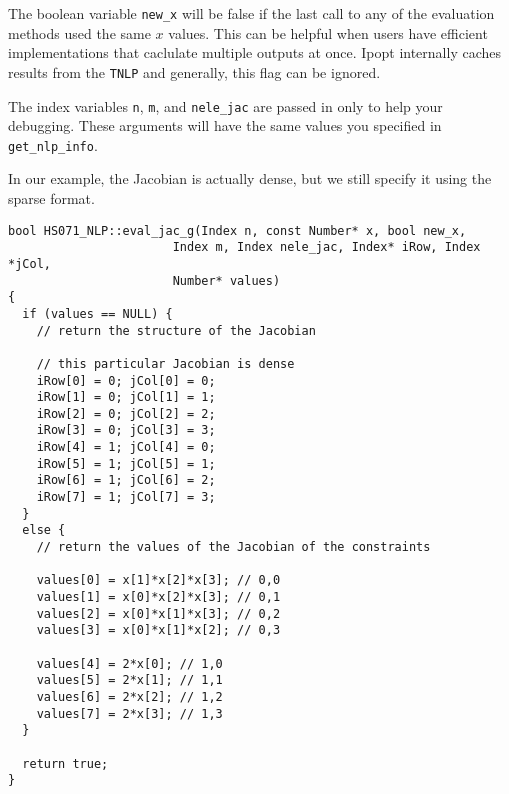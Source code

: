 \documentclass[letter,10pt]{article}
\begin{document}
{The boolean variable {\tt new\_x} will be false if the last call to
any of the evaluation methods used the same $x$ values. This can be
helpful when users have efficient implementations that caclulate
multiple outputs at once. Ipopt internally caches results from the
{\tt TNLP} and generally, this flag can be ignored.

The index variables {\tt n}, {\tt m}, and {\tt nele\_jac} are passed
in only to help your debugging. These arguments will have the same
values you specified in {\tt get\_nlp\_info}.

In our example, the Jacobian is actually dense, but we still
specify it using the sparse format.

\begin{verbatim}
bool HS071_NLP::eval_jac_g(Index n, const Number* x, bool new_x,
                       Index m, Index nele_jac, Index* iRow, Index *jCol,
                       Number* values)
{
  if (values == NULL) {
    // return the structure of the Jacobian

    // this particular Jacobian is dense
    iRow[0] = 0; jCol[0] = 0;
    iRow[1] = 0; jCol[1] = 1;
    iRow[2] = 0; jCol[2] = 2;
    iRow[3] = 0; jCol[3] = 3;
    iRow[4] = 1; jCol[4] = 0;
    iRow[5] = 1; jCol[5] = 1;
    iRow[6] = 1; jCol[6] = 2;
    iRow[7] = 1; jCol[7] = 3;
  }
  else {
    // return the values of the Jacobian of the constraints
    
    values[0] = x[1]*x[2]*x[3]; // 0,0
    values[1] = x[0]*x[2]*x[3]; // 0,1
    values[2] = x[0]*x[1]*x[3]; // 0,2
    values[3] = x[0]*x[1]*x[2]; // 0,3

    values[4] = 2*x[0]; // 1,0
    values[5] = 2*x[1]; // 1,1
    values[6] = 2*x[2]; // 1,2
    values[7] = 2*x[3]; // 1,3
  }

  return true;
}
\end{verbatim}

}
\end{document}
